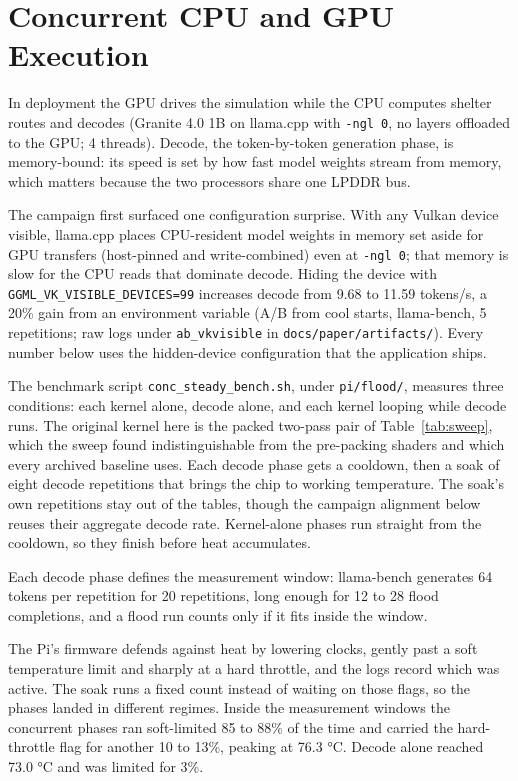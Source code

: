 \documentclass[conference]{IEEEtran}
\begin{document}
\section{Concurrent CPU and GPU
Execution}\label{concurrent-cpu-and-gpu-execution}

In deployment the GPU drives the simulation while the CPU computes
shelter routes and decodes (Granite 4.0 1B on llama.cpp with
\texttt{-ngl\ 0}, no layers offloaded to the GPU; 4 threads). Decode,
the token-by-token generation phase, is memory-bound: its speed is set
by how fast model weights stream from memory, which matters because the
two processors share one LPDDR bus.

The campaign first surfaced one configuration surprise. With any Vulkan
device visible, llama.cpp places CPU-resident model weights in memory
set aside for GPU transfers (host-pinned and write-combined) even at
\texttt{-ngl\ 0}; that memory is slow for the CPU reads that dominate
decode. Hiding the device with \texttt{GGML\_VK\_VISIBLE\_DEVICES=99}
increases decode from 9.68 to 11.59 tokens/s, a 20\% gain from an
environment variable (A/B from cool starts, llama-bench, 5 repetitions;
raw logs under \texttt{ab\_vkvisible} in
\texttt{docs/paper/artifacts/}). Every number below uses the
hidden-device configuration that the application ships.

The benchmark script \texttt{conc\_steady\_bench.sh}, under
\texttt{pi/flood/}, measures three conditions: each kernel alone, decode
alone, and each kernel looping while decode runs. The original kernel
here is the packed two-pass pair of
Table~\ref{tab:sweep}, which the sweep found
indistinguishable from the pre-packing shaders and which every archived
baseline uses. Each decode phase gets a cooldown, then a soak of eight
decode repetitions that brings the chip to working temperature. The
soak's own repetitions stay out of the tables, though the campaign
alignment below reuses their aggregate decode rate. Kernel-alone phases
run straight from the cooldown, so they finish before heat accumulates.

Each decode phase defines the measurement window: llama-bench generates
64 tokens per repetition for 20 repetitions, long enough for 12 to 28
flood completions, and a flood run counts only if it fits inside the
window.

The Pi's firmware defends against heat by lowering clocks, gently past a
soft temperature limit and sharply at a hard throttle, and the logs
record which was active. The soak runs a fixed count instead of waiting
on those flags, so the phases landed in different regimes. Inside the
measurement windows the concurrent phases ran soft-limited 85 to 88\% of
the time and carried the hard-throttle flag for another 10 to 13\%,
peaking at 76.3 °C. Decode alone reached 73.0 °C and was limited for
3\%.
\end{document}
